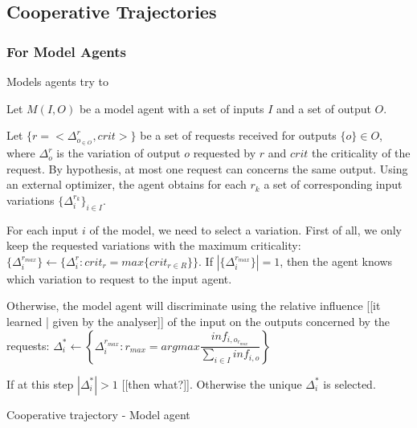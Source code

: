 \subsection{Cooperative Trajectories}

\subsubsection{For Model Agents}

Models agents try to 

Let $M(I,O)$ be a model agent with a set of inputs $I$ and a set of output $O$.

Let $\{r = <\Delta_{o_{\in O}}^{r}, crit>\}$ be a set of  requests received for outputs $\{o\} \in O$, where $\Delta_{o}^{r}$ is the variation of output $o$ requested by $r$ and $crit$ the criticality of the request. By hypothesis, at most one request can concerns the same output.
Using an external optimizer, the agent obtains for each $r_k$ a set of corresponding input variations $\{\Delta_i^{r_k}\}_{i \in I}$.

For each input $i$ of the model, we need to select a variation.
First of all, we only keep the requested variations with the maximum criticality:  $\{\Delta_i^{r_{max}}\} \leftarrow \{\Delta_i^r : crit_r = max \{crit_{r \in R}\}\}$.
If $|\{\Delta_i^{r_{max}}\}| =  1$, then the agent knows which variation to request to the input agent.

Otherwise, the model agent will discriminate using the relative influence [[it learned | given by the analyser]] of the input on the outputs concerned by the requests: 
$\Delta_i^* \leftarrow \left\{ \Delta_i^{r_{max}} : r_{max} = argmax \dfrac{inf_{i,o_{r_{max}}}}{\sum \limits_{i \in I} inf_{i,o}} \right\}$

If at this step $|\Delta_i^*| >1$ [[then what?]]. Otherwise the unique $\Delta_i^*$ is selected.

\begin{algorithm}
\caption{Cooperative trajectory - Model agent}
\label{algo_cooperative_trajectory_model}


\end{algorithm}

